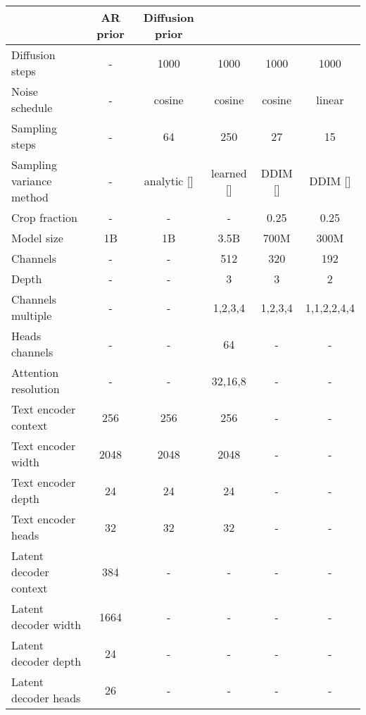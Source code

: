 \documentclass{article}
\newcommand{\shortcite}[1]{[\citenum{#1}]}
\begin{document}
\begin{table}[h]
    \setlength\tabcolsep{4pt}
    \begin{center}
    \begin{small}
    \begin{tabular}{lccccc}
    \toprule
                         & AR prior & Diffusion prior &  &  & \\
    \midrule
    Diffusion steps      & -         & 1000    & 1000    & 1000    & 1000 \\
    Noise schedule       & -         & cosine  & cosine  & cosine  & linear \\
    Sampling steps       & -         & 64      & 250     & 27      & 15 \\
    Sampling variance method & -     & analytic \shortcite{analyticddpm} & learned \shortcite{improved} & DDIM \shortcite{ddim}    & DDIM \shortcite{ddim} \\
    Crop fraction        & -         & -       & -       & 0.25    & 0.25 \\
    Model size           & 1B        & 1B      & 3.5B    & 700M    & 300M \\
    Channels             & -         & -       & 512     & 320     & 192 \\
    Depth                & -         & -       & 3       & 3       & 2 \\
    Channels multiple    & -         & -       & 1,2,3,4 & 1,2,3,4 & 1,1,2,2,4,4 \\
    Heads channels       & -         & -       & 64      & -       & - \\
    Attention resolution & -         & -       & 32,16,8 & -       & - \\
    Text encoder context    & 256       & 256     & 256     & -       & - \\
    Text encoder width      & 2048      & 2048    & 2048    & -       & - \\
    Text encoder depth      & 24        & 24      & 24      & -       & - \\ 
    Text encoder heads      & 32        & 32      & 32      & -       & - \\
    Latent decoder context  & 384       & -       & -       & -       & - \\
    Latent decoder width    & 1664      & -       & -       & -       & - \\
    Latent decoder depth    & 24        & -       & -       & -       & - \\ 
    Latent decoder heads    & 26        & -       & -       & -       & - \\

\end{tabular}
\end{small}
\end{center}
\end{table}
\end{document}
